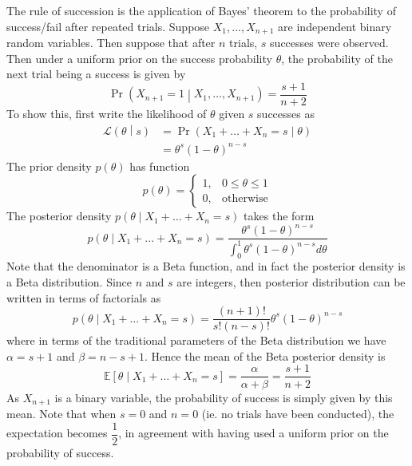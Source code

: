 \documentclass[11pt]{report} %
\begin{document}
The rule of succession is the application of Bayes' theorem to the probability of success/fail after repeated trials. Suppose $X_{1}, \dots, X_{n + 1}$ are independent binary random variables. Then suppose that after $n$ trials, $s$ successes were observed. Then under a uniform prior on the success probability $\theta$, the probability of the next trial being a success is given by
\begin{equation}
\operatorname{Pr}\left(X_{n + 1} = 1\middle|X_{1}, \dots, X_{n + 1}\right) = \dfrac{s + 1}{n + 2}
\end{equation}
To show this, first write the likelihood of $\theta$ given $s$ successes as
\begin{align}
\mathcal{L}\left(\theta\middle|s\right) &= \operatorname{Pr}\left(X_{1} + \dots + X_{n} = s\middle|\theta\right) \\
&= \theta^{s}\left(1 - \theta\right)^{n - s}
\end{align}
The prior density $p\left(\theta\right)$ has function
\begin{equation}
p\left(\theta\right) = \begin{cases} 1, & 0\leq \theta \leq 1 \\ 0, & \mathrm{otherwise}\end{cases}
\end{equation}
The posterior density $p\left(\theta\middle|X_{1} + \dots + X_{n} = s\right)$ takes the form
\begin{equation}
p\left(\theta\middle|X_{1} + \dots + X_{n} = s\right) = \dfrac{\theta^{s}\left(1 - \theta\right)^{n - s}}{\int_{0}^{1}\theta^{s}\left(1 - \theta\right)^{n - s}d\theta}
\end{equation}
Note that the denominator is a Beta function, and in fact the posterior density is a Beta distribution. Since $n$ and $s$ are integers, then posterior distribution can be written in terms of factorials as
\begin{equation}
p\left(\theta\middle|X_{1} + \dots + X_{n} = s\right) = \dfrac{\left(n + 1\right)!}{s!\left(n  - s\right)!}\theta^{s}\left(1 - \theta\right)^{n - s}
\end{equation}
where in terms of the traditional parameters of the Beta distribution we have $\alpha = s + 1$ and $\beta = n - s + 1$. Hence the mean of the Beta posterior density is
\begin{equation}
\mathbb{E}\left[\theta\middle|X_{1} + \dots + X_{n} = s\right] = \dfrac{\alpha}{\alpha + \beta} = \dfrac{s + 1}{n + 2} 
\end{equation}
As $X_{n + 1}$ is a binary variable, the probability of success is simply given by this mean. Note that when $s = 0$ and $n = 0$ (ie. no trials have been conducted), the expectation becomes $\dfrac{1}{2}$, in agreement with having used a uniform prior on the probability of success. \\
\end{document}
